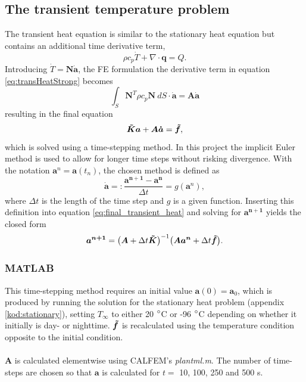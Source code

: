 \documentclass[a4paper,11pt]{article}
\begin{document}
\subsection{The transient temperature problem}
The transient heat equation is similar to the stationary heat equation but contains an additional time derivative term,
\begin{equation}
    \rho c_p \dot T + \nabla 
    \cdot \boldsymbol q = Q.
    \label{eq:transHeatStrong}
\end{equation}
Introducing $\dot T = \boldsymbol{N} \dot{\boldsymbol{a}}$, the FE formulation the derivative term in equation \ref{eq:transHeatStrong} becomes
\begin{equation}
     \int_S \boldsymbol N^T  \rho c_p \boldsymbol N \: dS \cdot \dot {\boldsymbol a} = \boldsymbol A \dot{\boldsymbol a}
\end{equation}
resulting in the final equation
\begin{equation}
    \boldsymbol{\Tilde{K}a} + \boldsymbol{A\dot{a}} = \boldsymbol{\Tilde{f}},
    \label{eq:final_transient_heat}
\end{equation}
which is solved using a time-stepping method. In this project the implicit Euler method is used to allow for longer time steps without risking divergence. With the notation $\boldsymbol{a}^n = \boldsymbol{a}(t_n)$, the chosen method is defined as
\begin{equation}
    \boldsymbol{\dot a} =: \frac{\boldsymbol{ a^{n+1}} - \boldsymbol{ a^{n}}}{\Delta t} = g(\boldsymbol a^n),
\end{equation}
where $\Delta t$ is the length of the time step and $g$ is a given function. Inserting this definition into equation \ref{eq:final_transient_heat} and solving for $\boldsymbol{a^{n+1}}$ yields the closed form
\begin{equation}
    \boldsymbol{ a^{n+1}} = \big (\boldsymbol A + \Delta t \boldsymbol{\Tilde{K}} \big )^{-1} \big (\boldsymbol A \boldsymbol{ a^n} + \Delta t \boldsymbol{\Tilde{f}} \big ).
    \label{eq:time step}
\end{equation}

 \subsubsection{MATLAB}
 This time-stepping method requires an initial value $\boldsymbol{a}(0) = \boldsymbol{a}_0$, which is produced by running the solution for the stationary heat problem (appendix \ref{kod:stationary}), setting $T_{\infty}$ to either 20 $\degree$C or -96 $\degree$C depending on whether it initially is day- or nighttime. $\boldsymbol{\Tilde{f}}$ is recalculated using the temperature condition opposite to the initial condition.\\
 \\$\boldsymbol{A}$ is calculated elementwise using CALFEM's \textit{plantml.m}. The number of time-steps are chosen so that $\boldsymbol{a}$ is calculated for $t= $ 10, 100, 250 and 500 s.
\end{document}
